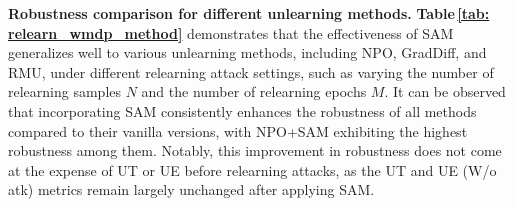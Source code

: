 \begin{table}[htb]
\caption{\small{Comparison of unlearning performance for different methods (NPO, GradDiff, and RMU) with and without SAM on WMDP under various relearning attacks settings. The table format follows Table\,\ref{tab: relearn_wmdp_npo}.
}
}
\label{tab: relearn_wmdp_method}
\begin{center}
\end{center}
\end{table}

\textbf{Robustness comparison for different unlearning methods.} \textbf{Table\,\ref{tab: relearn_wmdp_method}} demonstrates that the effectiveness of SAM generalizes well to various unlearning methods, including NPO, GradDiff, and RMU, under different relearning attack settings, such as varying the number of relearning samples \(N\) and the number of relearning epochs \(M\). It can be observed that incorporating SAM consistently enhances the robustness of all methods compared to their vanilla versions, with NPO+SAM exhibiting the highest robustness among them. Notably, this improvement in robustness does not come at the expense of UT or UE before relearning attacks, as the UT and UE (W/o atk) metrics remain largely unchanged after applying SAM.

